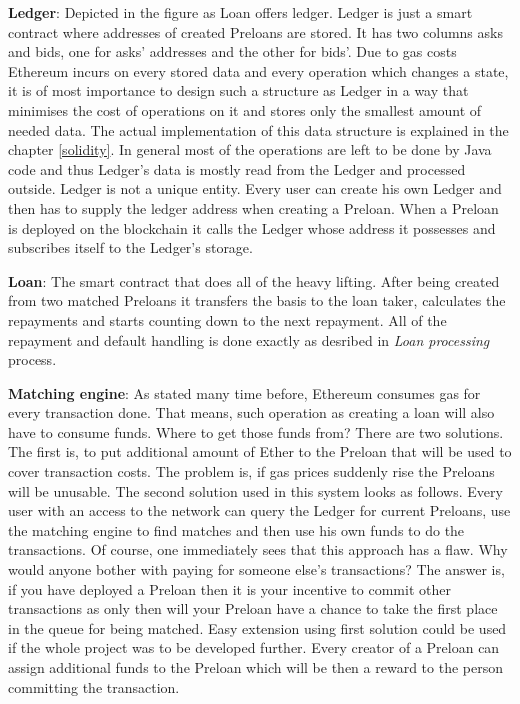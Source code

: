 \documentclass[a4paper,12pt,twoside,openany]{report}
\begin{document}
\textbf{Ledger}: Depicted in the figure as Loan offers ledger. Ledger is just a smart contract where addresses of created Preloans are stored. It has two columns asks and bids, one for asks' addresses and the other for bids'. Due to gas costs Ethereum incurs on every stored data and every operation which changes a state, it is of most importance to design such a structure as Ledger in a way that minimises the cost of operations on it and stores only the smallest amount of needed data. The actual implementation of this data structure is explained in the chapter \ref{solidity}. In general most of the operations are left to be done by Java code and thus Ledger's data is mostly read from the Ledger and processed outside. Ledger is not a unique entity. Every user can create his own Ledger and then has to supply the ledger address when creating a Preloan. When a Preloan is deployed on the blockchain it calls the Ledger whose address it possesses and subscribes itself to the Ledger's storage.

\textbf{Loan}: The smart contract that does all of the heavy lifting. After being created from two matched Preloans it transfers the basis to the loan taker, calculates the repayments and starts counting down to the next repayment. All of the repayment and default handling is done exactly as desribed in \textit{Loan processing} process.

\textbf{Matching engine}: As stated many time before, Ethereum consumes gas for every transaction done. That means, such operation as creating a loan will also have to consume funds. Where to get those funds from? There are two solutions. The first is, to put additional amount of Ether to the Preloan that will be used to cover transaction costs. The problem is, if gas prices suddenly rise the Preloans will be unusable. The second solution used in this system looks as follows. Every user with an access to the network can query the Ledger for current Preloans, use the matching engine to find matches and then use his own funds to do the transactions. Of course, one immediately sees that this approach has a flaw. Why would anyone bother with paying for someone else's transactions? The answer is, if you have deployed a Preloan then it is your incentive to commit other transactions as only then will your Preloan have a chance to take the first place in the queue for being matched. Easy extension using first solution could be used if the whole project was to be developed further. Every creator of a Preloan can assign additional funds to the Preloan which will be then a reward to the person committing the transaction.
\end{document}
